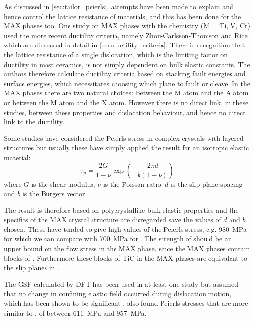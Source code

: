 As discussed in \autoref{sec:tailor_peierls}, attempts have been made to explain and hence control the lattice resistance of materials, and this has been done for the MAX phases too. One study on MAX phases \cite{Music2007ductility} with the chemistry  (M = Ti, V, Cr) used the more recent ductility criteria, namely Zhou-Carlsson-Thomson \cite{Zhou1994} and Rice \cite{Rice1992} which are discussed in detail in \autoref{sec:ductility_criteria}. There is recognition that the lattice resistance of a single dislocation, which is the limiting factor on ductility in most ceramics, is not simply dependent on bulk elastic constants. The authors therefore calculate ductility criteria based on stacking fault energies and surface energies, which necessitates choosing which plane to fault or cleave. In the MAX phases there are two natural choices: Between the M atom and the A atom or between the M atom and the X atom. However there is no direct link, in these studies, between these properties and dislocation behaviour, and hence no direct link to the ductility. 

Some studies have considered the Peierls stress in complex crystals with layered structures \cite{Music2008,Emmerlich2009,Gouriet2015} but usually these have simply applied the result for an isotropic elastic material:
\begin{equation}
\tau_p = \frac{2G}{1-\nu} \exp \left( - \frac{2 \pi d}{b(1-\nu)} \right)
\end{equation}
where $G$ is the shear modulus, $\nu$ is the Poisson ratio, $d$ is the slip plane spacing and $b$ is the Burgers vector.


The result is therefore based on polycrystalline bulk elastic properties and the specifics of the MAX crystal structure are disregarded save the values of $d$ and $b$ chosen. These have tended to give high values of the Peierls stress, e.g. \SI{980}{\mega\pascal} for  \cite{Music2008} which we can compare with \SI{700}{\mega\pascal} for  \cite{Clegg2006}. The strength of  should be an upper bound on the flow stress in the MAX phase, since the MAX phases contain blocks of . Furthermore these blocks of TiC in the MAX phases are equivalent to the slip planes in  \cite{Hollox1966}. 

The GSF calculated by DFT has been used in at least one study \cite{Gouriet2015} but assumed that no change in confining elastic field occurred during dislocation motion, which has been shown to be significant \cite{Lubarda2007,Clegg2006}. \citet{Gouriet2015} also found Peierls stresses that are more similar to , of between \SI{611}{\mega\pascal} and \SI{957}{\mega\pascal}.

